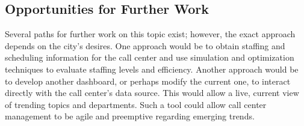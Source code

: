 \documentclass[11pt,twocolumn]{article}
\begin{document}
\subsection{Opportunities for Further Work}

Several paths for further work on this topic exist; however, the exact approach depends on the city's desires.  One approach would be to obtain staffing and scheduling information for the call center and use simulation and optimization techniques to evaluate staffing levels and efficiency.  Another approach would be to develop another dashboard, or perhaps modify the current one, to interact directly with the call center's data source.  This would allow a live, current view of trending topics and departments.  Such a tool could allow call center management to be agile and preemptive regarding emerging trends.


\end{document}
